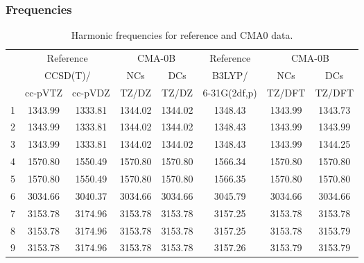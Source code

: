 \documentclass[10pt,oneside]{article}
\begin{document}
\subsubsection*{Frequencies}
\begin{table}[h!]
\centering
\caption{Harmonic frequencies for reference and CMA0 data.}
\begin{tabular}{cccccccc}
\toprule
{} & \multicolumn{2}{c}{Reference} & \multicolumn{2}{c}{CMA-0B} &    Reference & \multicolumn{2}{c}{CMA-0B} \\
{} & \multicolumn{2}{c}{CCSD(T)/} &     NCs &     DCs &       B3LYP/ &     NCs &     DCs \\
{} &   cc-pVTZ & cc-pVDZ &   TZ/DZ &   TZ/DZ & 6-31G(2df,p) &  TZ/DFT &  TZ/DFT \\
\midrule
1 &   1343.99 & 1333.81 & 1344.02 & 1344.02 &      1348.43 & 1343.99 & 1343.73 \\
2 &   1343.99 & 1333.81 & 1344.02 & 1344.02 &      1348.43 & 1343.99 & 1343.99 \\
3 &   1343.99 & 1333.81 & 1344.02 & 1344.02 &      1348.43 & 1343.99 & 1344.25 \\
4 &   1570.80 & 1550.49 & 1570.80 & 1570.80 &      1566.34 & 1570.80 & 1570.80 \\
5 &   1570.80 & 1550.49 & 1570.80 & 1570.80 &      1566.35 & 1570.80 & 1570.80 \\
6 &   3034.66 & 3040.37 & 3034.66 & 3034.66 &      3045.79 & 3034.66 & 3034.66 \\
7 &   3153.78 & 3174.96 & 3153.78 & 3153.78 &      3157.25 & 3153.78 & 3153.78 \\
8 &   3153.78 & 3174.96 & 3153.78 & 3153.78 &      3157.25 & 3153.78 & 3153.79 \\
9 &   3153.78 & 3174.96 & 3153.78 & 3153.78 &      3157.26 & 3153.79 & 3153.79 \\
\bottomrule
\end{tabular}
\end{table}

\clearpage
\end{document}
